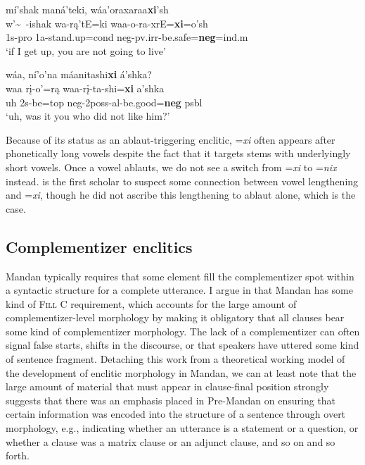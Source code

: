 \begin{exe}
\begin{xlist}
	\item\label{negativexi5}
	\glll mí'shak maná'teki, wáa'oraxaraa\textbf{xi}'sh\\
	w'\~~-ishak wa-rą'tE=ki waa-o-ra-xrE=\textbf{xi}=o'sh\\
	1s-pro 1a-\textnormal{stand.up}=cond neg-pv.irr-\textnormal{be.safe}=\textbf{neg}=ind.m\\
	\glt `if I get up, you are not going to live' \citep[123]{hollow1973b}
	
	\item\label{negativexi6}
	\glll wáa, ní'o'na máanitashi\textbf{xi} á'shka?\\
	waa rį-o'=rą waa-rį-ta-shi=\textbf{xi} a'shka\\
	\textnormal{uh} 2s-\textnormal{be}=top neg-2poss-al-\textnormal{be.good}=\textbf{neg} psbl\\
	\glt `uh, was it you who did not like him?' \citep[237]{hollow1973b}
	
	\end{xlist}

\end{exe}

Because of its status as an ablaut-triggering enclitic, =\textit{xi} often appears after phonetically long vowels despite the fact that it targets stems with underlyingly short vowels. Once a vowel ablauts, we do not see a switch from =\textit{xi} to =\textit{nix} instead. \citet[37]{mixco1997a} is the first scholar to suspect some connection between vowel lengthening and =\textit{xi}, though he did not ascribe this lengthening to ablaut alone, which is the case.

\subsection{Complementizer enclitics}\label{SecComplementizers}

Mandan typically requires that some element fill the complementizer spot within a syntactic structure for a complete utterance. I argue in \citet[305]{kasak2019} that Mandan has some kind of \textsc{Fill} C requirement, which accounts for the large amount of complementizer-level morphology by making it obligatory that all clauses bear some kind of complementizer morphology. The lack of a complementizer can often signal false starts, shifts in the discourse, or that speakers have uttered some kind of sentence fragment. Detaching this work from a theoretical working model of the development of enclitic morphology in Mandan, we can at least note that the large amount of material that must appear in clause-final position strongly suggests that there was an emphasis placed in Pre-Mandan on ensuring that certain information was encoded into the structure of a sentence through overt morphology, e.g., indicating whether an utterance is a statement or a question, or whether a clause was a matrix clause or an adjunct clause, and so on and so forth.

